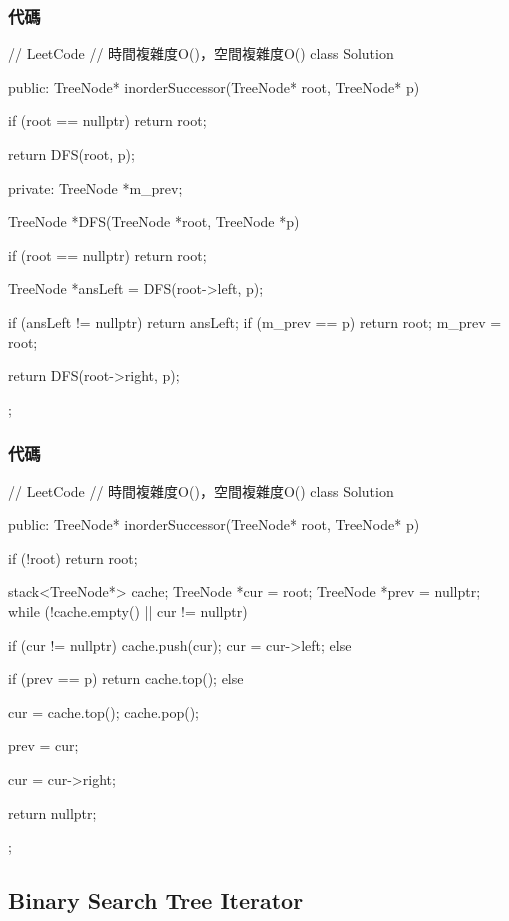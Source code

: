\subsubsection{代碼}
\begin{Code}
// LeetCode
// 時間複雜度O()，空間複雜度O()
class Solution {
public:
    TreeNode* inorderSuccessor(TreeNode* root, TreeNode* p) {
        if (root == nullptr) return root;

        return DFS(root, p);
    }
private:
    TreeNode *m_prev;

    TreeNode *DFS(TreeNode *root, TreeNode *p)
    {
        if (root == nullptr) return root;

        TreeNode *ansLeft = DFS(root->left, p);

        if (ansLeft != nullptr) return ansLeft;
        if (m_prev == p) return root;
        m_prev = root;

        return DFS(root->right, p);
    }
};
\end{Code}


\subsubsection{代碼}
\begin{Code}
// LeetCode
// 時間複雜度O()，空間複雜度O()
class Solution {
public:
    TreeNode* inorderSuccessor(TreeNode* root, TreeNode* p) {
        if (!root) return root;

        stack<TreeNode*> cache;
        TreeNode *cur = root;
        TreeNode *prev = nullptr;
        while (!cache.empty() || cur != nullptr)
        {
            if (cur != nullptr)
            {
                cache.push(cur);
                cur = cur->left;
            }
            else
            {
                if (prev == p)
                {
                    return cache.top();
                }
                else
                {
                    cur = cache.top();
                    cache.pop();

                    prev = cur;

                    cur = cur->right;
                }
            }
        }

        return nullptr;
    }
};
\end{Code}

\subsection{Binary Search Tree Iterator}
\label{sec:binary-search-tree-iterator}

